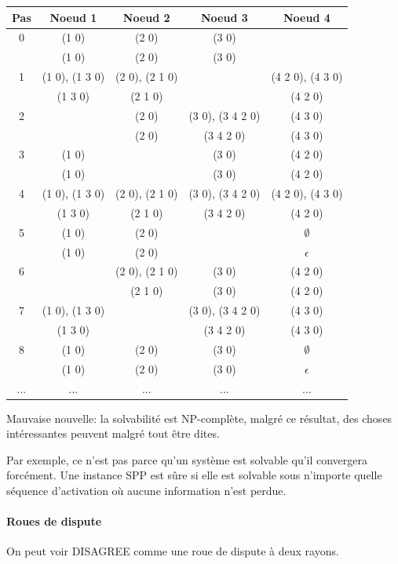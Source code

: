 \documentclass{report}
\begin{document}
\begin{tabular}{|c|c|c|c|c|}
  \hline
  Pas & Noeud 1 & Noeud 2 & Noeud 3 & Noeud 4 \\
  \hline
  0 & (1 0) & (2 0) & (3 0) & \\
  & (1 0) & (2 0) & (3 0) & \\
  \hline
  1 & (1 0), (1 3 0) & (2 0), (2 1 0) & & (4 2 0), (4 3 0) \\
  & (1 3 0) & (2 1 0) & & (4 2 0) \\
  \hline
  2 & & (2 0) & (3 0), (3 4 2 0) & (4 3 0) \\
  & & (2 0) & (3 4 2 0) & (4 3 0) \\
  \hline
  3 & (1 0) & & (3 0) & (4 2 0) \\
  & (1 0) & & (3 0) & (4 2 0) \\
  \hline
  4 & (1 0), (1 3 0) & (2 0), (2 1 0) & (3 0), (3 4 2 0) & (4 2 0), (4 3 0) \\
  & (1 3 0) & (2 1 0) & (3 4 2 0) & (4 2 0) \\
  \hline
  5 & (1 0) & (2 0) & & $\emptyset$ \\
  & (1 0) & (2 0) & & $\epsilon$ \\
  \hline
  6 & & (2 0), (2 1 0) & (3 0) & (4 2 0) \\
  & & (2 1 0) & (3 0) & (4 2 0) \\
  \hline
  7 & (1 0), (1 3 0) & & (3 0), (3 4 2 0) & (4 3 0) \\
  & (1 3 0) & & (3 4 2 0) & (4 3 0) \\
  \hline
  8 & (1 0) & (2 0) & (3 0) & $\emptyset$ \\
  & (1 0) & (2 0) & (3 0) & $\epsilon$ \\
  \hline
  ... & ... & ... & ... & ...
\end{tabular}

Mauvaise nouvelle: la solvabilité est NP-complète, malgré ce résultat,
des choses intéressantes peuvent malgré tout être dites.

Par exemple, ce n'est pas parce qu'un système est solvable qu'il
convergera forcément. Une instance SPP est sûre si elle est solvable
sous n'importe quelle séquence d'activation où aucune information
n'est perdue.

\paragraph{Roues de dispute}

On peut voir DISAGREE comme une roue de dispute à deux rayons.
\end{document}
